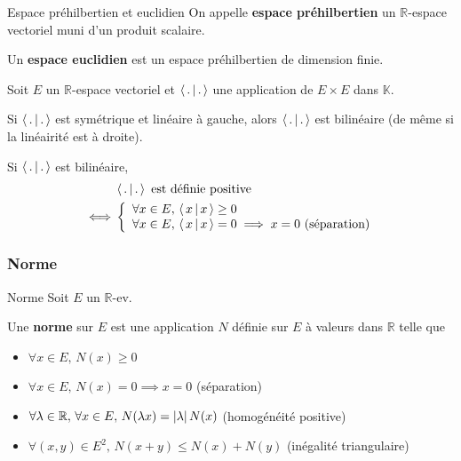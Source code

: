         \begin{defi}{Espace préhilbertien et euclidien}{}
            On appelle \textbf{espace préhilbertien} un $\mathbb{R}$-espace vectoriel muni d’un produit scalaire.

            Un \textbf{espace euclidien} est un espace préhilbertien de dimension finie.
        \end{defi}

        \begin{prop}{}{}
            Soit $E$ un $\mathbb{R}$-espace vectoriel et $\left<\,.\,\middle|\,.\,\right>$ une application de $E \times E$ dans $\mathbb{K}$.
    
            \begin{alors}
                \item Si $\left<\,.\,\middle|\,.\,\right>$ est symétrique et linéaire à gauche, alors $\left<\,.\,\middle|\,.\,\right>$ est bilinéaire (de même si la linéairité est à droite).
                \item Si $\left<\,.\,\middle|\,.\,\right>$ est bilinéaire, 
                \begin{align*}
                    & \spr{.}{.} \text{ est définie positive} \\
                    \iff & \et{\forall x \in E, \, \spr{x}{x} \geq 0}{\forall x \in E, \, \spr{x}{x} = 0 \implies x = 0 \text{ (séparation)}}
                \end{align*}
            \end{alors}
        \end{prop}

        \subsubsection{Norme}

        \begin{defi}{Norme}{}
            Soit $E$ un $\mathbb{R}$-ev.
            
            Une \textbf{norme} sur $E$ est une application $N$ définie sur $E$ à valeurs dans $\mathbb{R}$ telle que 
            \begin{itemize}
                \item $\forall x \in E, \, N(x) \geq 0$
                \item $\forall x \in E, \, N(x) = 0 \implies x = 0$ \quad (séparation)
                \item $\forall \lambda \in \mathbb{R}, \, \forall x \in E, \, N(\lambda x) = \left\lvert \lambda\right\rvert N(x)$ \quad (homogénéité positive)
                \item $\forall (x,y) \in E^2, \, N(x+y) \leq N(x) + N(y)$ \quad (inégalité triangulaire)
            \end{itemize}
        \end{defi}
        
